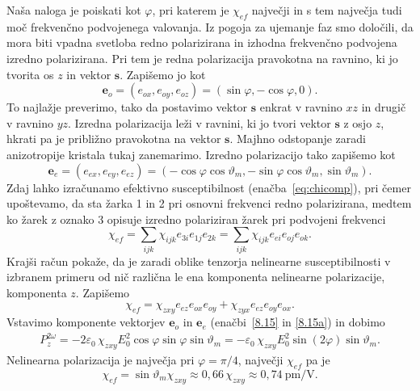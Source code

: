 Naša naloga je poiskati kot $\varphi$, pri katerem je 
$\chi_{ef}$ največji in s tem največja tudi moč frekvenčno podvojenega valovanja.
Iz pogoja za ujemanje faz smo določili, da mora biti vpadna svetloba redno polarizirana in 
izhodna frekvenčno podvojena izredno polarizirana. Pri tem je redna polarizacija pravokotna na 
ravnino, ki jo tvorita os $z$ in vektor $\mathbf{s}$. Zapišemo jo kot
\begin{equation}
\mathbf{e}_o=(e_{ox}, e_{oy}, e_{oz}) = (\sin\varphi,-\cos\varphi,0).
\label{8.15}
\end{equation}
To najlažje preverimo, tako da postavimo vektor $\mathbf{s}$ enkrat v ravnino $xz$ in
drugič v ravnino $yz$. Izredna polarizacija leži v ravnini, ki jo tvori 
vektor $\mathbf{s}$ z osjo $z$, hkrati pa je približno pravokotna na vektor $\mathbf{s}$. 
Majhno odstopanje zaradi anizotropije kristala tukaj zanemarimo. Izredno polarizacijo 
tako zapišemo kot  
\begin{equation}
\mathbf{e}_e=(e_{ex}, e_{ey}, e_{ez}) 
=(-\cos \varphi \cos \vartheta_m,-\sin \varphi \cos \vartheta_m ,\sin \vartheta_m).
\label{8.15a}
\end{equation}
Zdaj lahko izračunamo efektivno susceptibilnost (enačba~\ref{eq:chicomp}), 
pri čemer upoštevamo, da sta žarka 1 in 2 pri osnovni frekvenci redno polarizirana, medtem ko
žarek z oznako 3 opisuje izredno polariziran žarek pri podvojeni frekvenci
\begin{equation}
\chi_{ef} = \sum_{ijk} \chi_{ijk} e_{3i} e_{1j} e_{2k} = \sum_{ijk} \chi_{ijk} e_{ei} e_{oj} e_{ok}.
\end{equation}
Krajši račun pokaže, da je zaradi oblike tenzorja nelinearne susceptibilnosti v izbranem 
primeru od nič različna le ena komponenta nelinearne polarizacije, komponenta $z$. Zapišemo
\begin{equation}
\chi_{ef} = \chi_{zxy} e_{ez} e_{ox} e_{oy} + \chi_{zyx} e_{ez} e_{oy} e_{ox}.
\end{equation}
Vstavimo komponente vektorjev $\mathbf{e}_o$ in $\mathbf{e}_e$ (enačbi~\ref{8.15} in \ref{8.15a}) in dobimo
\begin{align}
P_{z}^{2\omega}=- 2\varepsilon_0\, \chi_{zxy}E_{0}^2\cos\varphi\sin\varphi
\sin\vartheta_m = - \varepsilon_0\, \chi_{zxy}E_{0}^2\sin(2\varphi) \sin\vartheta_m.
\label{8.151}
\end{align}
Nelinearna polarizacija je največja pri $\varphi=\pi/4$, največji $\chi_{ef}$  pa je 
\begin{equation}
\chi_{ef}= 
\sin\vartheta_m \chi_{zxy} \approx 0,66\, \chi_{zxy} \approx 
0,74~\si{\pico\metre/\volt}.
\label{8.16}
\end{equation}

